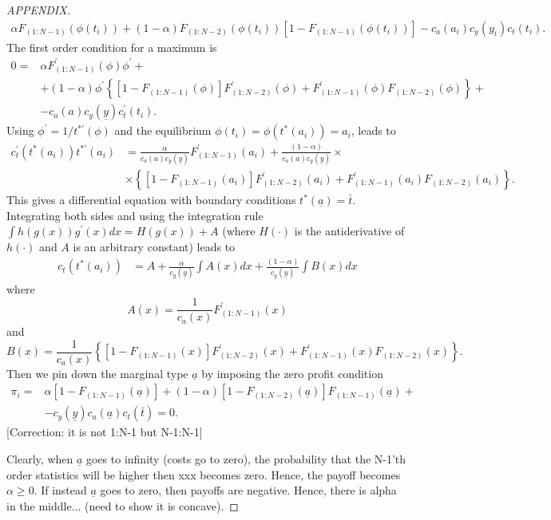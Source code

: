 \documentclass[12pt,]{article}
\theoremstyle{plain} %
\newcommand\deadline{\bar{t}}
\newcommand\target{\underline{y}}
\newcommand\ctime{c_{t}}
\newcommand\cscore{c_{y}}
\newcommand\cability{c_{a}}
\newcommand\costs{\cability(a_i)\cscore(y_i)\ctime(t_i)}
\newcommand\marginaltype{\underline{a}}
\newcommand\mtype{\underline{a}}
\begin{document}
\begin{shaded}
\begin{proof}[APPENDIX]
\begin{align}
  \alpha F_{(1:N-1)}(\phi(t_i)) 
  + (1-\alpha) F_{(1:N-2)}(\phi(t_i))\left[1 - F_{(1:N-1)}(\phi(t_i))\right]
  - \costs.
\end{align}
The first order condition for a maximum \citep[see][]{moldovanu2001optimal} is
\begin{align} \label{foc0}
  0 = & \alpha F_{(1:N-1)}^{\prime}(\phi) \phi^{\prime} + \nonumber\\
    & + (1-\alpha)\phi^{\prime}\left\{
        \left[1 - F_{(1:N-1)}(\phi)\right]F_{(1:N-2)}^{\prime}(\phi)
        + F_{(1:N-1)}^{\prime}(\phi) F_{(1:N-2)}(\phi)\right\} + \nonumber\\
    & - c_{a}(a) c_{y}(\target) c_{t}^{\prime}(t_i).
\end{align}
Using $\phi^\prime =  1 / t^{*\prime}(\phi)$ and the equilibrium $\phi(t_i) = \phi(t^*(a_i)) = a_i$, leads to
\begin{align} \label{foc}
  c_{t}^{\prime}(t^{*}(a_i)) t^{*\prime}(a_i) 
      & = \frac{\alpha}{c_{a}(a) c_{y}(\target)} F_{(1:N-1)}^{\prime}(a_i)
        + \frac{(1-\alpha)}{c_{a}(a) c_{y}(\target)}\times \nonumber\\
      & \times\left\{\left[1 - F_{(1:N-1)}(a_i)\right]F_{(1:N-2)}^{\prime}(a_i)
        + F_{(1:N-1)}^{\prime}(a_i) F_{(1:N-2)}(a_i)\right\}.
\end{align}
This gives a differential equation with boundary conditions $t^*(\mtype) = \deadline$. 
Integrating both sides and using the integration rule $\int h(g(x)) g^\prime(x) dx = H(g(x)) + A$ (where $H(\cdot)$ is the antiderivative of $h(\cdot)$ and $A$ is an arbitrary constant) leads to
\begin{align} \label{foc}
  c_{t}(t^{*}(a_i))
      & = A + \frac{\alpha}{c_{y}(\target)} \int A(x) dx
        + \frac{(1-\alpha)}{c_{y}(\target)} \int B(x) dx
\end{align}
where 
\[
  A(x) = \frac{1}{c_{a}(x)} F_{(1:N-1)}^{\prime}(x)
\]
and
\[
  B(x) = \frac{1}{c_{a}(x)} \left\{
      \left[1- F_{(1:N-1)}(x)\right]F_{(1:N-2)}^{\prime}(x)
      + F_{(1:N-1)}^{\prime}(x) F_{(1:N-2)}(x)
    \right\}.
\]
Then we pin down the marginal type $\mtype$ by imposing the zero profit condition
\begin{align}
  \pi_i = & \alpha \left[1 - F_{(1:N-1)}(\mtype)\right] 
      + (1-\alpha) \left[1- F_{(1:N-2)}(\mtype)\right]F_{(1:N-1)}(\mtype) + \nonumber\\
    & - c_y(\target) c_a(\mtype) c_{t}(\deadline) = 0.
\end{align}
[Correction: it is not 1:N-1 but N-1:N-1]

Clearly, when $\marginaltype$ goes to infinity (costs go to zero), the probability that the N-1'th order statistics will be higher then xxx becomes zero. Hence, the payoff becomes $\alpha \geq 0$. If instead $\marginaltype$ goes to zero, then payoffs are negative. Hence, there is alpha in the middle... (need to show it is concave). 
\end{proof}
\end{shaded}
\end{document}
